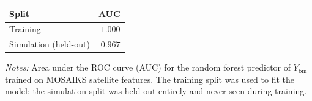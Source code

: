 \begin{threeparttable}
\begin{tabular}{lr}
\toprule
Split & AUC \\
\midrule
Training & $1.000$ \\
Simulation (held-out) & $0.967$ \\
\bottomrule
\end{tabular}
\begin{tablenotes}[flushleft]
\small
\item \textit{Notes:} Area under the ROC curve (AUC) for the random forest predictor of $Y_{\text{bin}}$ trained on MOSAIKS satellite features. The training split was used to fit the model; the simulation split was held out entirely and never seen during training.
\end{tablenotes}
\end{threeparttable}
